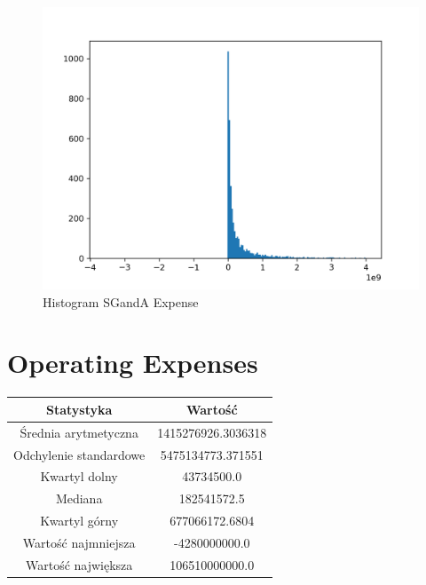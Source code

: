 \documentclass{article}
\begin{document}
\begin{figure}[h!]
    \includegraphics[width=\linewidth]{variables/SG_A Expense.png}
    \caption{Histogram SGandA Expense }
\end{figure}\section{ Operating Expenses }

\begin{center}
    \begin{tabular}{|c | c|} 
    \hline
    Statystyka & Wartość \\
    \hline\hline
    Średnia arytmetyczna & 1415276926.3036318 \\ 
    \hline
    Odchylenie standardowe & 5475134773.371551 \\
    \hline
    Kwartyl dolny & 43734500.0 \\
    \hline
    Mediana & 182541572.5 \\
    \hline
    Kwartyl górny & 677066172.6804 \\
    \hline
    Wartość najmniejsza & -4280000000.0 \\
    \hline
    Wartość największa & 106510000000.0 \\
    \hline
   \end{tabular}
\end{center}
\end{document}
